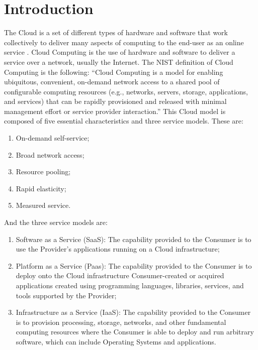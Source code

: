 \chapter{Introduction}\label{ch:introduction}
The Cloud is a set of different types of hardware and software that work collectively to deliver many aspects of computing to the end-user as an online service \cite{lenovo_cloud}. Cloud Computing is the use of hardware and software to deliver a service over a network, usually the Internet. The NIST definition of Cloud Computing is the following: ``Cloud Computing is a model for enabling ubiquitous, convenient, on-demand network access to a shared pool of configurable computing resources (e.g., networks, servers, storage, applications, and services) that can be rapidly provisioned and released with minimal management effort or service provider interaction.''\cite{nist:cloud_computing} This Cloud model is composed of five essential characteristics and three service models. These are:
\begin{enumerate}
    \item On-demand self-service;
    \item Broad network access;
    \item Resource pooling;
    \item Rapid elasticity;
    \item Measured service.
\end{enumerate}

\noindent
And the three service models are:
\begin{enumerate}
    \item Software as a Service (SaaS): The capability provided to the Consumer is to use the Provider's applications running on a Cloud infrastructure;
    \item Platform as a Service (Paas): The capability provided to the Consumer is to deploy onto the Cloud infrastructure Consumer-created or acquired applications created using programming languages, libraries, services, and tools supported by the Provider;
    \item Infrastructure as a Service (IaaS): The capability provided to the Consumer is to provision processing, storage, networks, and other fundamental computing resources where the Consumer is able to deploy and run arbitrary software, which can include Operating Systems and applications.
\end{enumerate}


